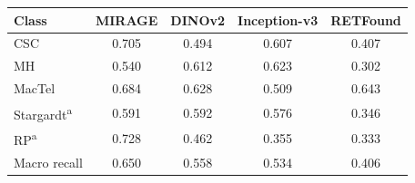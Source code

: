 \begin{tabular}{@{}lcccc@{}}
\toprule
Class & MIRAGE & DINOv2 & Inception-v3 & RETFound \\
\midrule
CSC & 0.705 & 0.494 & 0.607 & 0.407 \\
MH & 0.540 & 0.612 & 0.623 & 0.302 \\
MacTel & 0.684 & 0.628 & 0.509 & 0.643 \\
Stargardt\textsuperscript{a} & 0.591 & 0.592 & 0.576 & 0.346 \\
RP\textsuperscript{a} & 0.728 & 0.462 & 0.355 & 0.333 \\
\midrule Macro recall & 0.650 & 0.558 & 0.534 & 0.406 \\
\bottomrule
\end{tabular}
